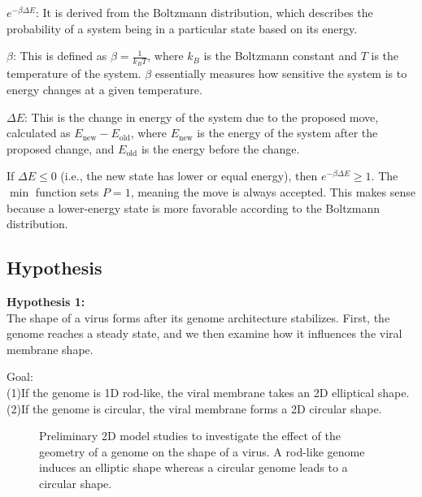\documentclass[12pt]{article}
\begin{document}
\begin{flushleft}
 $e^{-\beta \Delta E}$: It is derived from the Boltzmann distribution, which describes the probability of a system being in a particular state based on its energy.

 $\beta$: This is defined as $\beta = \frac{1}{k_B T}$, where $k_B$ is the Boltzmann constant and $T$ is the temperature of the system. $\beta$ essentially measures how sensitive the system is to energy changes at a given temperature.
 


 $\Delta E$: This is the change in energy of the system due to the proposed move, calculated as $E_{\text{new}} - E_{\text{old}}$, where $E_{\text{new}}$ is the energy of the system after the proposed change, and $E_{\text{old}}$ is the energy before the change.


If $\Delta E \leq 0$ (i.e., the new state has lower or equal energy), then $e^{-\beta \Delta E} \geq 1$. The $\min$ function sets $P = 1$, meaning the move is always accepted. This makes sense because a lower-energy state is more favorable according to the Boltzmann distribution.




\subsection*{Hypothesis}

\noindent \textbf{Hypothesis 1:}\\
The shape of a virus forms after its genome architecture stabilizes. First, the genome reaches a steady state, and we then examine how it influences the viral membrane shape. 

\noindent Goal:\\
	(1)If the genome is 1D rod-like, the viral membrane takes an 2D elliptical shape.\\
	(2)If the genome is circular, the viral membrane forms a 2D circular shape.
	
\begin{figure}[!ht]
  \centering
  \caption{Preliminary 2D model studies to
investigate the effect of the geometry of a
genome on the shape of a virus. A rod-like
genome induces an elliptic shape whereas a
circular genome leads to a circular shape.}
\end{figure}
	

\end{flushleft}
\end{document}
